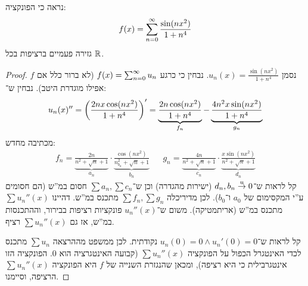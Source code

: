 \documentclass[]{../../../../tex/classes/homework}
\begin{document}
	\section{}
	נראה כי הפונקציה: 
	\[ f(x) = \sum_{n = 0}^{\infty} \frac{\sin(nx^{2})}{1 + n^{4}} \]
	גזירה פעמיים ברציפות בכל $\mathbb{R}$. 
	\begin{proof}
		נסמן $u_n(x) = \frac{\sin(nx^{2})}{1 + n^{4}}$. נבחין כי כרגע $f(x) = \sum_{n = 0}^{\infty} u_n$ (לא ברור כלל אם $f$ אפילו מוגדרת היטב). נבחין ש־: 
		\[ u_n(x)'' = \left ( \frac{2nx\cos(nx^{2})}{1 + n^{4}} \right )' = \underbrace{\frac{2n\cos(nx^{2})}{1 + n^4}}_{f_n}-\underbrace{\frac{4n^{2}x\sin(nx^{2})}{1 + n^{4}}}_{g_n} \]
		מכתיבה מחדש: 
		\begin{align*}
			f_n = \underbrace{\frac{2n}{n^{2} + \sqrt n + 1}}_{a_n}\cdot \underbrace{\frac{\cos(nx^{2})}{n^{2}_{b_n} + \sqrt n + 1}}_{b_n} && g_n = \underbrace{\frac{4n}{n^{2} + \sqrt n + 1}}_{c_n} \cdot \underbrace{\frac{x\sin(nx^{2})}{n^{2} + \sqrt n + 1}}_{d_n}
		\end{align*}
		קל לראות ש־$d_n, b_n \overset{u}{\to} 0$ (ישירות מהגדרה) וכן ש־$\sum a_n, \sum c_n$ חסום במ''ש (הם חסומים ע''י המקסימום של $a_0$ ו־$b_0$). לכן מדיריכלה $\sum f_n, \sum g_n$ מתכנס במ''ש. דהיינו $\sum u_n''(x)$ מתכנס במ''ש (אריתמטיקה). משום ש־$u_n''(x)$ פונקציות רציפות בבירור, וההתכנסות במ''ש, אז גם $\sum u_n''(x)$ רציף. 
		
		קל לראות ש־$u_n(0)= 0 \land u_n'(0) = 0$ נקודתית. לכן ממשפט מההרצאה $\sum u_n$ מתכנס לכדי האינטגרל הכפול על הפונקציה $\sum u_n''(x)$ (קבועה האינטגרציה הוא $0$. הפונקציה הזו אינטגרבילית כי היא רציפה), ומכאן שהנגזרת השנייה של $f$ היא הפונקציה $\sum u_n''(x)$ הרציפה, וסיימנו. 
		
	\end{proof}
	
\end{document}

